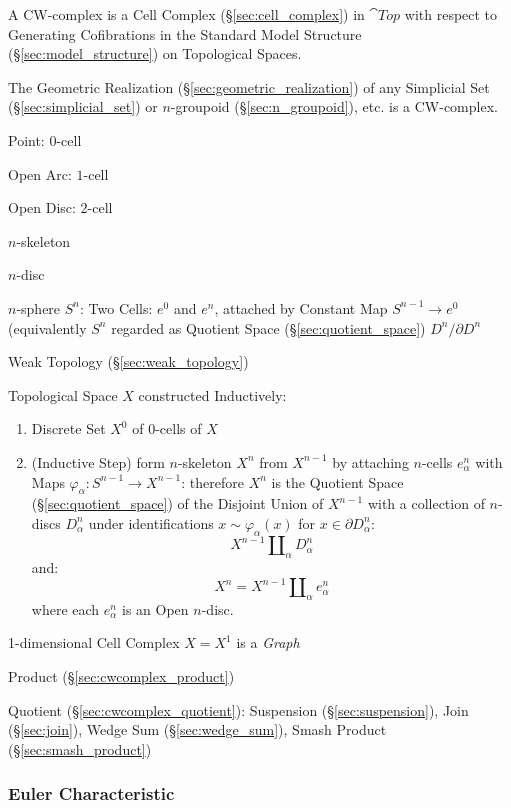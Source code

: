 A CW-complex is a Cell Complex (\S\ref{sec:cell_complex}) in
$\cat{Top}$ with respect to Generating Cofibrations in the Standard
Model Structure (\S\ref{sec:model_structure}) on Topological Spaces.

The Geometric Realization (\S\ref{sec:geometric_realization}) of any
Simplicial Set (\S\ref{sec:simplicial_set}) or $n$-groupoid
(\S\ref{sec:n_groupoid}), etc. is a CW-complex.

Point: $0$-cell

Open Arc: $1$-cell

Open Disc: $2$-cell

$n$-skeleton

$n$-disc

$n$-sphere $S^n$: Two Cells: $e^0$ and $e^n$, attached by Constant Map
$S^{n-1} \rightarrow e^0$ (equivalently $S^n$ regarded as Quotient
Space (\S\ref{sec:quotient_space}) $D^n/ \partial D^n$

Weak Topology (\S\ref{sec:weak_topology})

Topological Space $X$ constructed Inductively: \cite{hatcher02}
\begin{enumerate}
  \item Discrete Set $X^0$ of $0$-cells of $X$
  \item (Inductive Step) form $n$-skeleton $X^n$ from $X^{n-1}$ by
    attaching $n$-cells $e^n_\alpha$ with Maps $\varphi_\alpha :
    S^{n-1} \rightarrow X^{n-1}$: therefore $X^n$ is the Quotient
    Space (\S\ref{sec:quotient_space}) of the Disjoint Union of
    $X^{n-1}$ with a collection of $n$-discs $D^n_\alpha$ under
    identifications $x \sim \varphi_\alpha(x)$ for $x \in \partial
    D^n_\alpha$:
    \[
      X^{n-1}\amalg_\alpha D^n_\alpha
    \]
    and:
    \[
      X^n = X^{n-1}\amalg_\alpha e^n_\alpha
    \]
    where each $e^n_\alpha$ is an Open $n$-disc.
\end{enumerate}

1-dimensional Cell Complex $X = X^1$ is a \emph{Graph}

Product (\S\ref{sec:cwcomplex_product})

Quotient (\S\ref{sec:cwcomplex_quotient}): Suspension
(\S\ref{sec:suspension}), Join (\S\ref{sec:join}), Wedge Sum
(\S\ref{sec:wedge_sum}), Smash Product (\S\ref{sec:smash_product})



\subsubsection{Euler Characteristic}\label{sec:euler_characteristic}


